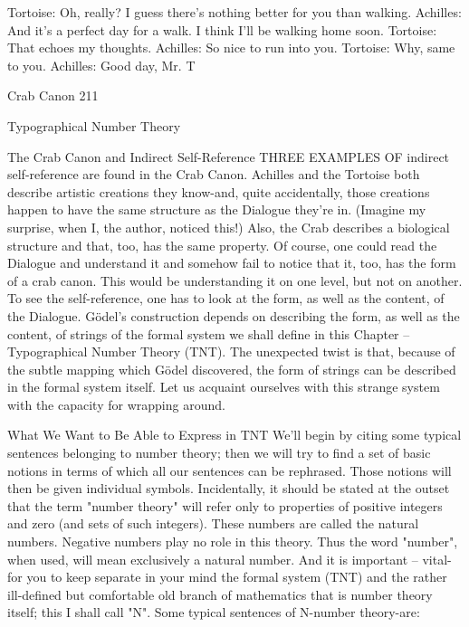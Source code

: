 
Tortoise: Oh, really? I guess there's nothing better for you than walking.
Achilles: And it's a perfect day for a walk. I think I'll be walking home soon.
Tortoise: That echoes my thoughts.
Achilles: So nice to run into you.
Tortoise: Why, same to you.
Achilles: Good day, Mr. T




Crab Canon                                                                        211


                 Typographical Number Theory

                 The Crab Canon and Indirect Self-Reference
THREE EXAMPLES OF indirect self-reference are found in the Crab Canon. Achilles
and the Tortoise both describe artistic creations they know-and, quite accidentally, those
creations happen to have the same structure as the Dialogue they're in. (Imagine my
surprise, when I, the author, noticed this!) Also, the Crab describes a biological structure
and that, too, has the same property. Of course, one could read the Dialogue and
understand it and somehow fail to notice that it, too, has the form of a crab canon. This
would be understanding it on one level, but not on another. To see the self-reference, one
has to look at the form, as well as the content, of the Dialogue.
        Gödel’s construction depends on describing the form, as well as the content, of
strings of the formal system we shall define in this Chapter -- Typographical Number
Theory (TNT). The unexpected twist is that, because of the subtle mapping which Gödel
discovered, the form of strings can be described in the formal system itself. Let us
acquaint ourselves with this strange system with the capacity for wrapping around.

What We Want to Be Able to Express in TNT
We'll begin by citing some typical sentences belonging to number theory; then we will
try to find a set of basic notions in terms of which all our sentences can be rephrased.
Those notions will then be given individual symbols. Incidentally, it should be stated at
the outset that the term "number theory" will refer only to properties of positive integers
and zero (and sets of such integers). These numbers are called the natural numbers.
Negative numbers play no role in this theory. Thus the word "number", when used, will
mean exclusively a natural number. And it is important -- vital-for you to keep separate in
your mind the formal system (TNT) and the rather ill-defined but comfortable old branch
of mathematics that is number theory itself; this I shall call "N".
Some typical sentences of N-number theory-are:

